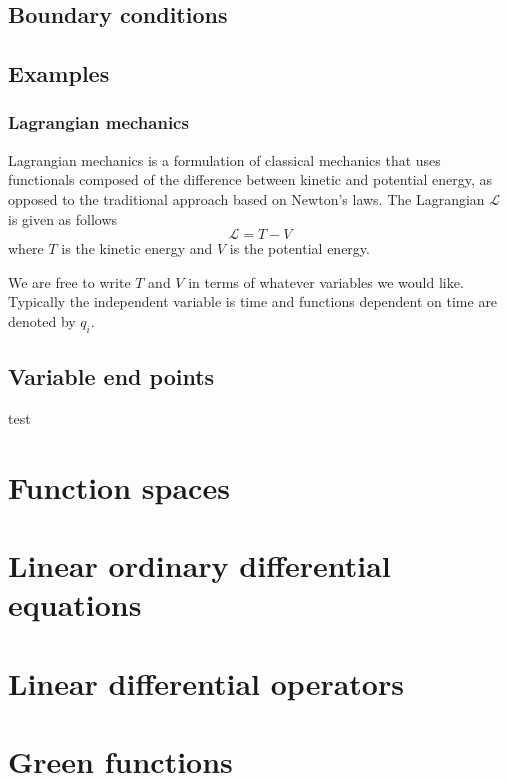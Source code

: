 \documentclass[]{article}
\begin{document}
\subsection{Boundary conditions}
\subsection{Examples}
\subsubsection{Lagrangian mechanics}
Lagrangian mechanics is a formulation of classical mechanics that uses functionals composed of the difference between kinetic and potential energy, as opposed to the traditional approach based on Newton's laws. The Lagrangian $\mathcal{L}$ is given as follows
\begin{equation} \mathcal{L} = T - V \end{equation}
where $T$ is the kinetic energy and $V$ is the potential energy. 

We are free to write $T$ and $V$ in terms of whatever variables we would like. Typically the independent variable is time and functions dependent on time are denoted by $q_{i}$.
\subsection{Variable end points}
test
\nocite{*}




\section{Function spaces}

\section{Linear ordinary differential equations}

\section{Linear differential operators}

\section{Green functions}
\end{document}

